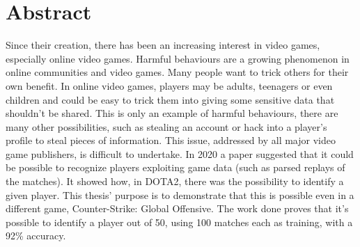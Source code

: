 
\cleardoublepage
{}
{}
\begingroup
\let\clearpage\relax
\let\cleardoublepage\relax
\let\cleardoublepage\relax

\chapter*{Abstract}

	Since their creation, there has been an increasing interest in video games, especially online video games. 
	Harmful behaviours are a growing phenomenon in online communities and video games. 
	Many people want to trick others for their own benefit.
	In online video games, players may be adults, teenagers or even children and could be easy to trick them into giving some sensitive data that shouldn't be shared.
	This is only an example of harmful behaviours, there are many other possibilities, such as stealing an account or hack into a player's profile to steal pieces of information.
	This issue, addressed by all major video game publishers, is difficult to undertake.
	In 2020 a paper suggested that it could be possible to recognize players exploiting game data (such as parsed replays of the matches). 
	It showed how, in DOTA2, there was the possibility to identify a given player. 
	This thesis' purpose is to demonstrate that this is possible even in a different game, Counter-Strike: Global Offensive. 
	The work done proves that it's possible to identify a player out of 50, using 100 matches each as training, with a 92\% accuracy.

\endgroup			

\vfill


